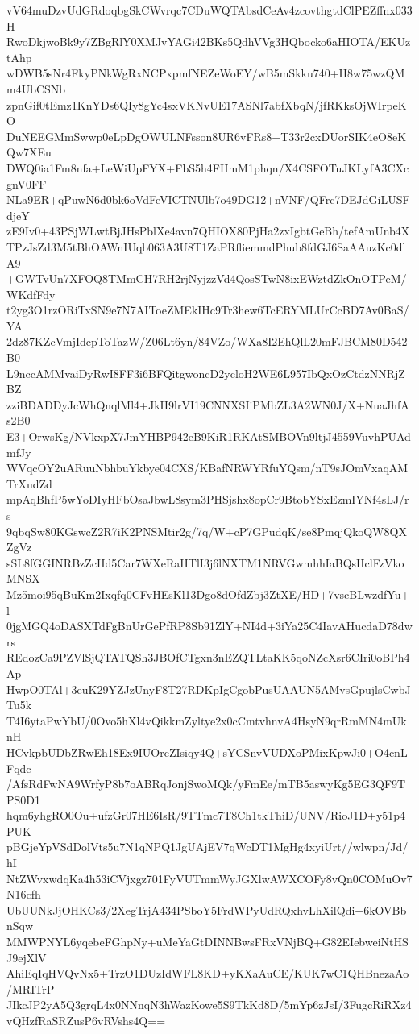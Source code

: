 vV64muDzvUdGRdoqbgSkCWvrqc7CDuWQTAbsdCeAv4zcovthgtdClPEZffnx033H
RwoDkjwoBk9y7ZBgRlY0XMJvYAGi42BKs5QdhVVg3HQbocko6aHIOTA/EKUztAhp
wDWB5sNr4FkyPNkWgRxNCPxpmfNEZeWoEY/wB5mSkku740+H8w75wzQMm4UbCSNb
zpnGif0tEmz1KnYDs6QIy8gYc4sxVKNvUE17ASNl7abfXbqN/jfRKksOjWIrpeKO
DuNEEGMmSwwp0eLpDgOWULNFsson8UR6vFRs8+T33r2cxDUorSIK4eO8eKQw7XEu
DWQ0ia1Fm8nfa+LeWiUpFYX+FbS5h4FHmM1phqn/X4CSFOTuJKLyfA3CXcgnV0FF
NLa9ER+qPuwN6d0bk6oVdFeVICTNUlb7o49DG12+nVNF/QFrc7DEJdGiLUSFdjeY
zE9Iv0+43PSjWLwtBjJHsPblXe4avn7QHIOX80PjHa2zxIgbtGeBh/tefAmUnb4X
TPzJsZd3M5tBhOAWnIUqb063A3U8T1ZaPRfliemmdPhub8fdGJ6SaAAuzKc0dlA9
+GWTvUn7XFOQ8TMmCH7RH2rjNyjzzVd4QosSTwN8ixEWztdZkOnOTPeM/WKdfFdy
t2yg3O1rzORiTxSN9e7N7AIToeZMEkIHc9Tr3hew6TcERYMLUrCcBD7Av0BaS/YA
2dz87KZcVmjIdcpToTazW/Z06Lt6yn/84VZo/WXa8I2EhQlL20mFJBCM80D542B0
L9nccAMMvaiDyRwI8FF3i6BFQitgwoncD2ycloH2WE6L957IbQxOzCtdzNNRjZBZ
zziBDADDyJcWhQnqlMl4+JkH9lrVI19CNNXSIiPMbZL3A2WN0J/X+NuaJhfAs2B0
E3+OrwsKg/NVkxpX7JmYHBP942eB9KiR1RKAtSMBOVn9ltjJ4559VuvhPUAdmfJy
WVqcOY2uARuuNbhbuYkbye04CXS/KBafNRWYRfuYQsm/nT9sJOmVxaqAMTrXudZd
mpAqBhfP5wYoDIyHFbOsaJbwL8sym3PHSjshx8opCr9BtobYSxEzmIYNf4sLJ/rs
9qbqSw80KGswcZ2R7iK2PNSMtir2g/7q/W+cP7GPudqK/se8PmqjQkoQW8QXZgVz
sSL8fGGINRBzZcHd5Car7WXeRaHTlI3j6lNXTM1NRVGwmhhIaBQsHclFzVkoMNSX
Mz5moi95qBuKm2Ixqfq0CFvHEsKl13Dgo8dOfdZbj3ZtXE/HD+7vscBLwzdfYu+l
0jgMGQ4oDASXTdFgBnUrGePfRP8Sb91ZlY+NI4d+3iYa25C4IavAHucdaD78dwrs
REdozCa9PZVlSjQTATQSh3JBOfCTgxn3nEZQTLtaKK5qoNZcXsr6CIri0oBPh4Ap
HwpO0TAl+3euK29YZJzUnyF8T27RDKpIgCgobPusUAAUN5AMvsGpujlsCwbJTu5k
T4I6ytaPwYbU/0Ovo5hXl4vQikkmZyltye2x0cCmtvhnvA4HsyN9qrRmMN4mUknH
HCvkpbUDbZRwEh18Ex9IUOrcZIsiqy4Q+sYCSnvVUDXoPMixKpwJi0+O4cnLFqdc
/AfsRdFwNA9WrfyP8b7oABRqJonjSwoMQk/yFmEe/mTB5aswyKg5EG3QF9TPS0D1
hqm6yhgRO0Ou+ufzGr07HE6IsR/9TTmc7T8Ch1tkThiD/UNV/RioJ1D+y51p4PUK
pBGjeYpVSdDolVts5u7N1qNPQ1JgUAjEV7qWcDT1MgHg4xyiUrt//wlwpn/Jd/hI
NtZWvxwdqKa4h53iCVjxgz701FyVUTmmWyJGXlwAWXCOFy8vQn0COMuOv7N16cfh
UbUUNkJjOHKCs3/2XegTrjA434PSboY5FrdWPyUdRQxhvLhXilQdi+6kOVBbnSqw
MMWPNYL6yqebeFGhpNy+uMeYaGtDINNBwsFRxVNjBQ+G82EIebweiNtHSJ9ejXlV
AhiEqIqHVQvNx5+TrzO1DUzIdWFL8KD+yKXaAuCE/KUK7wC1QHBnezaAo/MRITrP
JIkcJP2yA5Q3grqL4x0NNnqN3hWazKowe5S9TkKd8D/5mYp6zJsI/3FugcRiRXz4
vQHzfRaSRZusP6vRVshs4Q==
